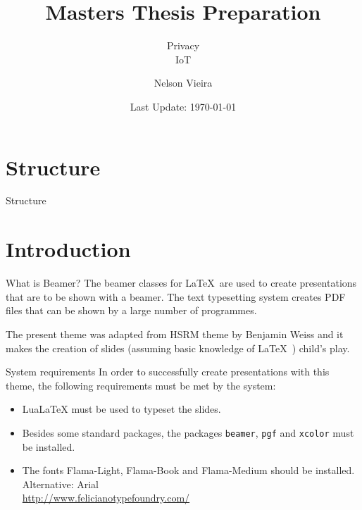 \documentclass[14pt, aspectratio=169]{beamer}
\title{Masters Thesis Preparation}
\subtitle{Privacy \\ {\small IoT}}
\author{Nelson Vieira}
\date{Last Update: \today}
\begin{document}
\maketitle

\section*{Structure}
\begin{frame}{Structure}
	\tableofcontents[hideallsubsections]
\end{frame}

\section{Introduction}

\begin{frame}{What is Beamer?}
	The beamer classes for \LaTeX\ are used to create presentations that are to be shown with a beamer. The text typesetting system creates PDF files that can be shown by a large number of programmes.

	The present theme was adapted from HSRM theme by Benjamin Weiss and it makes the creation of slides (assuming basic knowledge of \LaTeX\ ) child's play.
\end{frame}

\begin{frame}{System requirements}
	In order to successfully create presentations with this theme, the following requirements must be met by the system:
	\begin{itemize}
		\item LuaLaTeX must be used to typeset the slides.
		\item Besides some standard packages, the packages \texttt{beamer}, \texttt{pgf} and \texttt{xcolor} must be installed.
		\item The fonts Flama-Light, Flama-Book and Flama-Medium should be installed. Alternative: Arial\\\url{http://www.felicianotypefoundry.com/}
	\end{itemize}
\end{frame}

\end{document}
